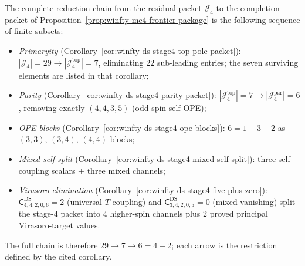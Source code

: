 \begin{computation}
\label{comp:winfty-stage4-reduction-chain}
The complete reduction chain from the residual packet
$\mathcal{J}_4$ to the completion packet of
Proposition~\ref{prop:winfty-mc4-frontier-package} is the following
sequence of finite subsets:
\begin{itemize}
\item \emph{Primaryity}
 (Corollary~\ref{cor:winfty-ds-stage4-top-pole-packet}):
 $|\mathcal{J}_4| = 29 \to |\mathcal{J}_4^{\mathrm{top}}| = 7$,
 eliminating $22$ sub-leading entries; the seven surviving elements
 are listed in that corollary;
\item \emph{Parity}
 (Corollary~\ref{cor:winfty-ds-stage4-parity-packet}):
 $|\mathcal{J}_4^{\mathrm{top}}| = 7
 \to |\mathcal{J}_4^{\mathrm{par}}| = 6$,
 removing exactly $(4,4,3,5)$ (odd-spin self-OPE);
\item \emph{OPE blocks}
 (Corollary~\ref{cor:winfty-ds-stage4-ope-blocks}):
 $6 = 1 + 3 + 2$ as $(3,3)$, $(3,4)$, $(4,4)$ blocks;
\item \emph{Mixed-self split}
 (Corollary~\ref{cor:winfty-ds-stage4-mixed-self-split}):
 three self-coupling scalars $+$ three mixed channels;
\item \emph{Virasoro elimination}
 (Corollary~\ref{cor:winfty-ds-stage4-five-plus-zero}):
 $\mathsf{C}^{\mathrm{DS}}_{4,4;2;0,6} = 2$ (universal $T$-coupling)
 and $\mathsf{C}^{\mathrm{DS}}_{3,4;2;0,5} = 0$ (mixed vanishing)
 split the stage-$4$ packet into $4$ higher-spin channels plus
 $2$ proved principal Virasoro-target values.
\end{itemize}
The full chain is therefore $29 \to 7 \to 6 = 4 + 2$; each arrow is
the restriction defined by the cited corollary.
\end{computation}

